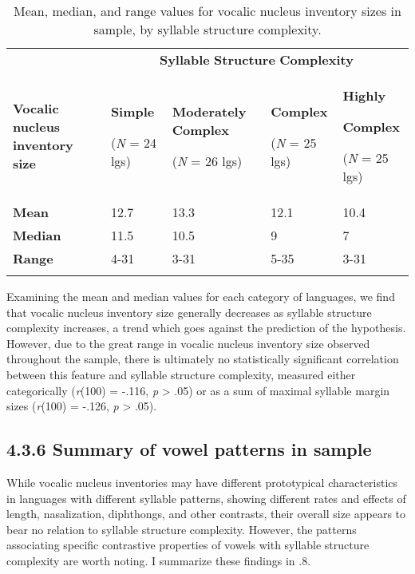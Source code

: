 \begin{table}
\begin{tabularx}{\textwidth}{XXXXX}
 & \multicolumn{4}{c}{ \textbf{Syllable} \textbf{Structure} \textbf{Complexity}}\\
\lsptoprule
\textbf{Vocalic} \textbf{nucleus} \textbf{inventory} \textbf{size} & { \textbf{Simple}}

 (\textit{N} = 24 lgs) & { \textbf{Moderately} \textbf{Complex}}

 (\textit{N} = 26 lgs) & { \textbf{Complex}}

 (\textit{N} = 25 lgs) & { \textbf{Highly} }

{ \textbf{Complex}}

 (\textit{N} = 25 lgs)\\
\textbf{Mean} & 12.7 & 13.3 & 12.1 & 10.4\\
\textbf{Median} & 11.5 & 10.5 & 9 & 7\\
\textbf{Range} & 4-31 & 3-31 & 5-35 & 3-31\\
\lspbottomrule
\end{tabularx}
\caption{\label{4.7}Mean, median, and range values for vocalic nucleus inventory sizes in sample, by syllable structure complexity.}
\end{table}


\z


  Examining the mean and median values for each category of languages, we find that vocalic nucleus inventory size generally decreases as syllable structure complexity increases, a trend which goes against the prediction of the hypothesis. However, due to the great range in vocalic nucleus inventory size observed throughout the sample, there is ultimately no statistically significant correlation between this feature and syllable structure complexity, measured either categorically (\textit{r}(100) = -.116, \textit{p} > .05) or as a sum of maximal syllable margin sizes (\textit{r}(100) = -.126, \textit{p} > .05). 


\subsection{4.3.6 Summary of vowel patterns in sample}

  While vocalic nucleus inventories may have different prototypical characteristics in languages with different syllable patterns, showing different rates and effects of length, nasalization, diphthongs, and other contrasts, their overall size appears to bear no relation to syllable structure complexity. However, the patterns associating specific contrastive properties of vowels with syllable structure complexity are worth noting. I summarize these findings in .8.






